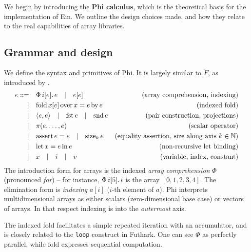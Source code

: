 We begin by introducing the \textbf{Phi calculus}, which is the theoretical basis for the implementation of Ein. We outline the design choices made, and how they relate to the real capabilities of array libraries.

\subsection{Grammar and design}

\newcommand{\philet}[3]{\mathrm{let}\,{#1}={#2}\,\mathrm{in}\,{#3}}
\newcommand{\phivec}[3]{\Phi\, {#1}[{#2}] \ldotp {#3}}
\newcommand{\phifold}[5]{\mathrm{fold}\,{#1}[{#2}]\,\mathrm{over}\,{#3} = {#4}\,\mathrm{by}\,{#5}}
\newcommand{\phipair}[2]{\left\langle {#1}, {#2} \right\rangle}
\newcommand{\phifst}[1]{\mathrm{fst}\,{#1}}
\newcommand{\phisnd}[1]{\mathrm{snd}\,{#1}}
\newcommand{\phisize}[2]{\mathrm{size}_{#2}\, {#1}}
\newcommand{\phiasserteq}[2]{\mathrm{assert}\,{#1}={#2}}

We define the syntax and primitives of Phi. It is largely similar to $\tilde F$, as introduced by \textcite{shaikhha2019efficient}.
\begin{align*}
e ::=&\quad \phivec{i}{e}{e} \quad|\quad e[e]   &\text{(array comprehension, indexing)} \\
|&\quad \phifold{x}{e}{x}{e}{e}  &\text{(indexed fold)} \\
|&\quad \phipair{e}{e} \quad|\quad \phifst{e} \quad|\quad \phisnd{e} &\text{(pair construction, projections)} \\
|&\quad \pi(e, \dots, e) &\text{(scalar operator)} \\
|&\quad \phiasserteq{e}{e} \quad|\quad \phisize{e}{k} &\text{(equality assertion, size along axis } k \in \mathbb N \text{)} \\
|&\quad \philet{x}{e}{e} &\text{(non-recursive let binding)} \\
|&\quad x \quad|\quad i \quad|\quad v &\text{(variable, index, constant)}
\end{align*}
The introduction form for arrays is the indexed \textit{array comprehension} $\Phi$ (pronounced \textit{for}) -- for instance, $\phivec{i}{5}{i}$ is the array $[0, 1, 2, 3, 4]$. The elimination form is \textit{indexing} $a[i]$ ($i$-th element of $a$). Phi interprets multidimensional arrays as either scalars (zero-dimensional base case) or vectors of arrays. In that respect indexing is into the \textit{outermost} axis. 

The indexed fold facilitates a simple repeated iteration with an accumulator, and is closely related to the \texttt{loop} construct in Futhark. One can see $\Phi$ as perfectly parallel, while $\mathrm{fold}$ expresses sequential computation.

